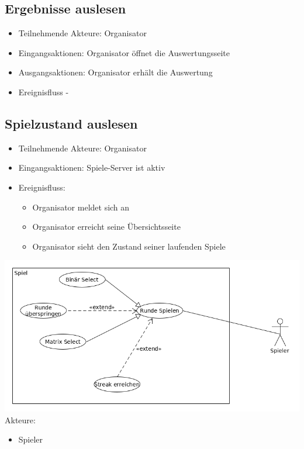 \documentclass[a4paper]{scrreprt}
\begin{document}
    \subsection{Ergebnisse auslesen}

    \begin{itemize}
        \item Teilnehmende Akteure: \Gls{Organisator}
        \item Eingangsaktionen: \Gls{Organisator} öffnet die Auswertungsseite
        \item Ausgangsaktionen: \Gls{Organisator} erhält die Auswertung
        \item Ereignisfluss -
    \end{itemize}
 \subsection{Spielzustand auslesen}
	\begin{itemize}
		\item Teilnehmende Akteure: \Gls{Organisator}
		\item Eingangsaktionen: Spiele-Server ist aktiv
		\item Ereignisfluss:
		\begin{itemize}
			\item Organisator meldet sich an
			\item Organisator erreicht seine Übersichtsseite
			\item Organisator sieht den Zustand seiner laufenden Spiele
		\end{itemize}
	\end{itemize}


    \newpage
    \includegraphics[width=\textwidth]{uml/export/Spiel.png}
    Akteure: 
    \begin{itemize}
    \item \Gls{Spieler}
    \newpage
    \end{itemize}
    
\end{document}
